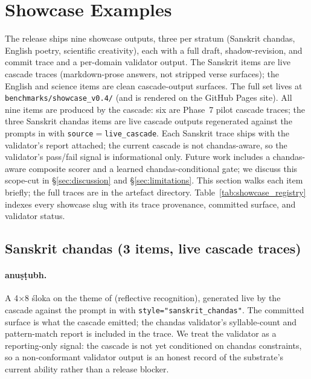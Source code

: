 \section{Showcase Examples}\label{sec:showcase}

\sloppy

The release ships nine showcase outputs, three per stratum (Sanskrit chandas, English poetry, scientific creativity), each with a full draft, shadow-revision, and commit trace and a per-domain validator output. The Sanskrit items are live cascade traces (markdown-prose answers, not stripped verse surfaces); the English and science items are clean cascade-output surfaces. The full set lives at \nolinkurl{benchmarks/showcase_v0.4/} (and is rendered on the GitHub Pages site). All nine items are produced by the cascade: six are Phase~7 pilot cascade traces; the three Sanskrit chandas items are live cascade outputs regenerated against the prompts in  with \texttt{source}${}={}$\texttt{live\_cascade}. Each Sanskrit trace ships with the  validator's report attached; the current cascade is not chandas-aware, so the validator's pass/fail signal is informational only. Future work includes a chandas-aware composite scorer and a learned chandas-conditional gate; we discuss this scope-cut in \S\ref{sec:discussion} and \S\ref{sec:limitations}. This section walks each item briefly; the full traces are in the artefact directory. Table~\ref{tab:showcase_registry} indexes every showcase slug with its trace provenance, committed surface, and validator status.



\subsection{Sanskrit chandas (3 items, live cascade traces)}

\paragraph{anu\d{s}\d{t}ubh.} A 4$\times$8 \'sloka on the theme of  (reflective recognition), generated live by the cascade against the prompt in  with \texttt{style="sanskrit\_chandas"}. The committed surface is what the cascade emitted; the chandas validator's syllable-count and pattern-match report is included in the trace. We treat the validator as a reporting-only signal: the cascade is not yet conditioned on chandas constraints, so a non-conformant validator output is an honest record of the substrate's current ability rather than a release blocker.

